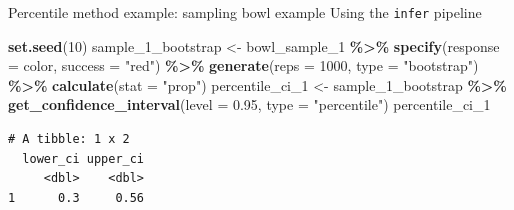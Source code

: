 \documentclass[
  ignorenonframetext,
]{beamer}
\newenvironment{Shaded}{\begin{snugshade}}{\end{snugshade}}
\newcommand{\AttributeTok}[1]{\textcolor[rgb]{0.13,0.29,0.53}{#1}}
\newcommand{\DecValTok}[1]{\textcolor[rgb]{0.00,0.00,0.81}{#1}}
\newcommand{\FloatTok}[1]{\textcolor[rgb]{0.00,0.00,0.81}{#1}}
\newcommand{\FunctionTok}[1]{\textcolor[rgb]{0.13,0.29,0.53}{\textbf{#1}}}
\newcommand{\NormalTok}[1]{#1}
\newcommand{\OtherTok}[1]{\textcolor[rgb]{0.56,0.35,0.01}{#1}}
\newcommand{\SpecialCharTok}[1]{\textcolor[rgb]{0.81,0.36,0.00}{\textbf{#1}}}
\newcommand{\StringTok}[1]{\textcolor[rgb]{0.31,0.60,0.02}{#1}}
\begin{document}
\begin{frame}[fragile]{Percentile method example: sampling bowl example}
\protect\hypertarget{percentile-method-example-sampling-bowl-example}{}
Using the \texttt{infer} pipeline

\begin{Shaded}
\begin{Highlighting}[]
\FunctionTok{set.seed}\NormalTok{(}\DecValTok{10}\NormalTok{)}
\NormalTok{sample\_1\_bootstrap }\OtherTok{\textless{}{-}}\NormalTok{ bowl\_sample\_1 }\SpecialCharTok{\%\textgreater{}\%} 
  \FunctionTok{specify}\NormalTok{(}\AttributeTok{response =}\NormalTok{ color, }\AttributeTok{success =} \StringTok{"red"}\NormalTok{) }\SpecialCharTok{\%\textgreater{}\%} 
  \FunctionTok{generate}\NormalTok{(}\AttributeTok{reps =} \DecValTok{1000}\NormalTok{, }\AttributeTok{type =} \StringTok{"bootstrap"}\NormalTok{) }\SpecialCharTok{\%\textgreater{}\%} 
  \FunctionTok{calculate}\NormalTok{(}\AttributeTok{stat =} \StringTok{"prop"}\NormalTok{)}
\NormalTok{percentile\_ci\_1 }\OtherTok{\textless{}{-}}\NormalTok{ sample\_1\_bootstrap }\SpecialCharTok{\%\textgreater{}\%} 
  \FunctionTok{get\_confidence\_interval}\NormalTok{(}\AttributeTok{level =} \FloatTok{0.95}\NormalTok{, }\AttributeTok{type =} \StringTok{"percentile"}\NormalTok{)}
\NormalTok{percentile\_ci\_1}
\end{Highlighting}
\end{Shaded}

\begin{verbatim}
# A tibble: 1 x 2
  lower_ci upper_ci
     <dbl>    <dbl>
1      0.3     0.56
\end{verbatim}
\end{frame}
\end{document}

